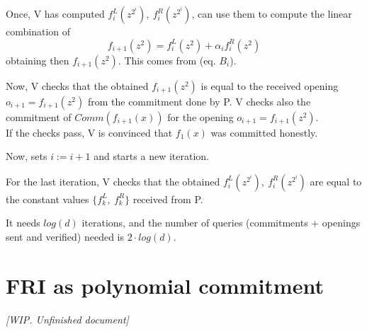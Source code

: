 \documentclass{article}
\theoremstyle{definition}
\begin{document}
Once, V has computed $f_i^L(z^{2^i}),~f_i^R(z^{2^i})$, can use them to compute the linear combination of
$$
f_{i+1}(z^2) = f_i^L(z^2) + \alpha_i f_i^R(z^2)
$$
obtaining then $f_{i+1}(z^2)$. This comes from (eq. $B_i$).

Now, V checks that the obtained $f_{i+1}(z^2)$ is equal to the received opening $o_{i+1}=f_{i+1}(z^2)$ from the commitment done by P.
V checks also the commitment of $Comm(f_{i+1}(x))$ for the opening $o_{i+1}=f_{i+1}(z^2)$.\\
If the checks pass, V is convinced that $f_1(x)$ was committed honestly.

Now, sets $i := i+1$ and starts a new iteration.

For the last iteration, V checks that the obtained $f_i^L(z^{2^i}),~f_i^R(z^{2^i})$ are equal to the constant values $\{f_k^L,~f_k^R\}$ received from P.

\vspace{10px}
It needs $log(d)$ iterations, and the number of queries (commitments + openings sent and verified) needed is $2 \cdot log(d)$.

\section{FRI as polynomial commitment}
\emph{[WIP. Unfinished document]}




\end{document}
